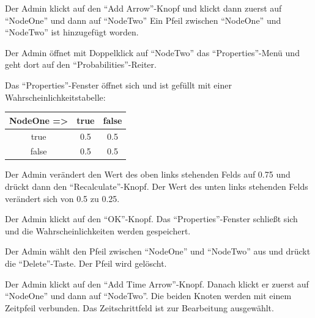 \documentclass[parskip=full,11pt,twoside]{scrartcl}
\begin{document}
{Der Admin klickt auf den \enquote{Add Arrow}-Knopf und klickt dann zuerst auf \enquote{NodeOne} und dann auf \enquote{NodeTwo}}
{Ein Pfeil zwischen \enquote{NodeOne} und \enquote{NodeTwo} ist hinzugefügt worden.}

{Der Admin öffnet mit Doppelklick auf \enquote{NodeTwo} das \enquote{Properties}-Menü und geht dort auf den \enquote{Probabilities}-Reiter.}
{Das \enquote{Properties}-Fenster öffnet sich und ist gefüllt mit einer Wahrscheinlichkeitstabelle:
\begin{tabular}{c || c | c}
    NodeOne => & true & false \\
    \hline
    true & 0.5 & 0.5 \\
    false & 0.5 & 0.5
\end{tabular}}

{Der Admin verändert den Wert des oben links stehenden Felds auf 0.75 und drückt dann den \enquote{Recalculate}-Knopf.}
{Der Wert des unten links stehenden Felds verändert sich von 0.5 zu 0.25.}

{Der Admin klickt auf den \enquote{OK}-Knopf.}
{Das \enquote{Properties}-Fenster schließt sich und die Wahrscheinlichkeiten werden gespeichert.}

{Der Admin wählt den Pfeil zwischen \enquote{NodeOne} und \enquote{NodeTwo} aus und drückt die \enquote{Delete}-Taste.}
{Der Pfeil wird gelöscht.}

{Der Admin klickt auf den \enquote{Add Time Arrow}-Knopf. Danach klickt er zuerst auf \enquote{NodeOne} und dann auf \enquote{NodeTwo}.}
{Die beiden Knoten werden mit einem Zeitpfeil verbunden. Das Zeitschrittfeld ist zur Bearbeitung ausgewählt.}
\end{document}
